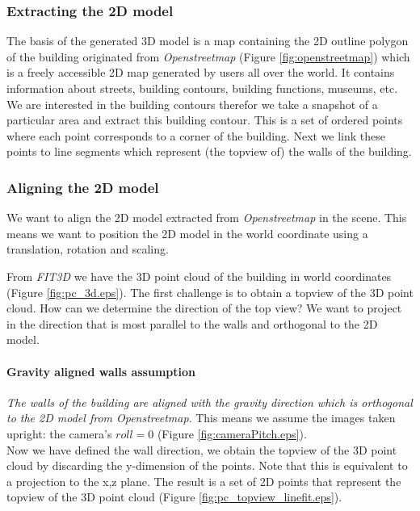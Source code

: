 \subsubsection{Extracting the 2D model}
The basis of the generated 3D model is a map containing the 2D outline polygon
of the building originated from \emph{Openstreetmap\cite{Openstreetmap}} 
(Figure \ref{fig:openstreetmap}) which is a freely accessible 2D map generated by
users all over the world. It contains information about streets, building
contours, building functions, museums, etc.  We are interested in the building
contours therefor we take a snapshot of a particular area and extract this building
contour.  This is a set of ordered points where each point corresponds to a
corner of the building.  Next we link these points to line segments which
represent (the topview of) the walls of the building.

\subsubsection{Aligning the 2D model}
We want to align the 2D model extracted from
\emph{Openstreetmap\cite{Openstreetmap}} in the scene. This means we want to
position the 2D model in the world coordinate using a translation, rotation and
scaling.

From \emph{FIT3D\cite{FIT3D}} we have the 3D point cloud of the building in world coordinates
(Figure \ref{fig:pc_3d.eps}).
The first challenge is to obtain a topview of the 3D point cloud.
How can we determine the direction of the top view? We want to project in the
direction that is most parallel to the walls and orthogonal to the 2D model.

\paragraph{Gravity aligned walls assumption}
	\emph{The walls of the building are aligned with the gravity direction 
	which is orthogonal to the 2D model from \emph{Openstreetmap\cite{Openstreetmap}}}. This means
	we assume the images taken upright: the camera's $roll=0$ (Figure
	\ref{fig:cameraPitch.eps}).\\

Now we have defined the wall direction, we obtain the topview of the 3D point
cloud by discarding the y-dimension of the points.  Note that this is equivalent to a
projection to the x,z plane. The result is a set of 2D points that represent the
topview of the 3D point cloud (Figure \ref{fig:pc_topview_linefit.eps}).

